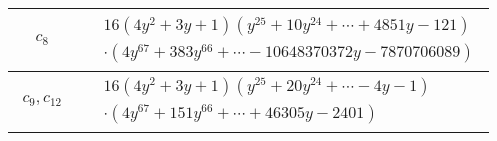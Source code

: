 \documentclass[1p]{elsarticle_modified}
\theoremstyle{definition}
\begin{document}
\begin{tabular}{m{50pt}|m{274pt}}
\hline $$\begin{aligned}c_{8}\end{aligned}$$&$\begin{aligned}
&16(4 y^2+3 y+1)(y^{25}+10 y^{24}+\cdots+4851 y-121)\\
&\cdot(4 y^{67}+383 y^{66}+\cdots-10648370372 y-7870706089)
\end{aligned}$\\
\hline $$\begin{aligned}c_{9},c_{12}\end{aligned}$$&$\begin{aligned}
&16(4 y^2+3 y+1)(y^{25}+20 y^{24}+\cdots-4 y-1)\\
&\cdot(4 y^{67}+151 y^{66}+\cdots+46305 y-2401)
\end{aligned}$\\
\hline
\end{tabular}
\vskip 2pc
\end{document}

